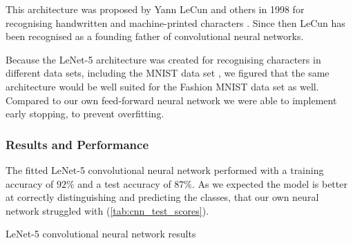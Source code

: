 \documentclass[../main.tex]{subfiles}
\begin{document}
This architecture was proposed by Yann LeCun and others in 1998 
for recognising handwritten and machine-printed characters 
\autocite{lecun-lenet}. Since then LeCun has been recognised as a 
founding father of convolutional neural networks.

Because the LeNet-5 architecture was created for recognising 
characters in different data sets, including the MNIST data set 
\autocite{digit_mnist}, we figured that the same architecture 
would be well suited for the Fashion MNIST data set as well. 
Compared to our own feed-forward neural network we were able to 
implement early stopping, to prevent overfitting. 


\subsubsection{Results and Performance}

The fitted LeNet-5 convolutional neural network performed with a 
training accuracy of $92\%$ and a test accuracy of $87\%$. As we 
expected the model is better at correctly distinguishing and 
predicting the classes, that our own neural network struggled 
with (\autoref{tab:cnn_test_scores}).

\begin{table}[ht]
    \centering
    
    \caption{LeNet-5 convolutional neural network results}
    \label{tab:cnn_test_scores}
\end{table}
\end{document}
